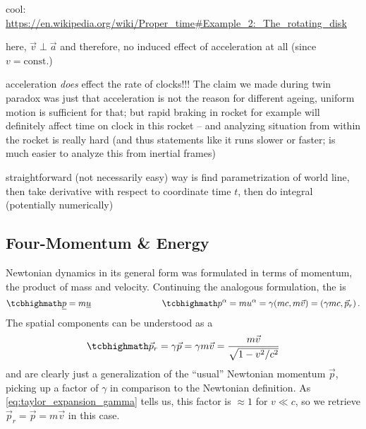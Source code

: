 \documentclass[../relativity_main.tex]{subfiles}
\begin{document}
\begin{ex}
	cool: \url{https://en.wikipedia.org/wiki/Proper_time#Example_2:_The_rotating_disk}

	here, $\vec{v} \perp \vec{a}$ and therefore, no induced effect of acceleration at all (since $v = \text{const.}$)
\end{ex}



\begin{ex}
	acceleration \emph{does} effect the rate of clocks!!! The claim we made during twin paradox was just that acceleration is not the reason for different ageing, uniform motion is sufficient for that; but rapid braking in rocket for example will definitely affect time on clock in this rocket -- and analyzing situation from within the rocket is really hard (and thus statements like it runs slower or faster; is much easier to analyze this from inertial frames)

	straightforward (not necessarily easy) way is find parametrization of world line, then take derivative with respect to coordinate time $t$, then do integral (potentially numerically)
\end{ex}



		\subsection{Four-Momentum \& Energy}
Newtonian dynamics in its general form was formulated in terms of momentum, the product of mass and velocity. Continuing the analogous formulation, the  is
\begin{equation}\label{eq:four_momentum}
	\eqbox{
	\fvec{p} = m \fvec{u}
	}
	\manyqquad
	\eqbox{
	p^\alpha = m u^\alpha = \gamma (m c, m \vec{v}) = (\gamma m c, \vec{p}_r)
	} \, .
\end{equation}
The spatial components can be understood as a 
\begin{equation}\label{eq:rel_momentum}
	\eqbox{
	\vec{p}_r = \gamma \vec{p} = \gamma m \vec{v} = \frac{m \vec{v}}{\sqrt{1 - v^2 / c^2}}
	}
\end{equation}
and are clearly just a generalization of the \enquote{usual} Newtonian momentum $\vec{p}$, picking up a factor of $\gamma$ in comparison to the Newtonian definition. As \eqref{eq:taylor_expansion_gamma} tells us, this factor is $\approx 1$ for $v \ll c$, so we retrieve $\vec{p}_r = \vec{p} = m \vec{v}$ in this case.
\end{document}
